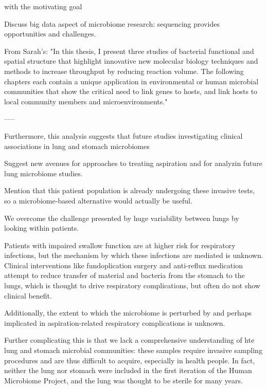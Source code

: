 with the motivating goal

Discuss big data aspect of microbiome research: sequencing provides opportunities and challenges.

From Sarah's: "In this thesis, I present three studies of bacterial functional and spatial structure that highlight innovative new molecular biology techniques and methods to increase throughput by reducing reaction volume. The following chapters each contain a unique application in environmental or human microbial communities that show the critical need to link genes to hosts, and link hosts to local community members and microenvironments."

-----

Furthermore, this analysis suggests that future studies investigating clinical associations in lung and stomach microbiomes

Suggest new avenues for approaches to treating aspiration and for analyzin future lung microbiome studies.

Mention that this patient population is already undergoing these invasive tests, so a microbiome-based alternative would actually be useful.

We overcome the challenge presented by huge variability between lungs by looking within patients.

Patients with impaired swallow function are at higher risk for respiratory infections, but the mechanism by which these infections are mediated is unknown.
Clinical interventions like fundoplication surgery and anti-reflux medication attempt to reduce transfer of material and bacteria from the stomach to the lungs, which is thought to drive respiratory complications, but often do not show clinical benefit.

Additionally, the extent to which the microbiome is perturbed by and perhaps implicated in aspiration-related respiratory complications is unknown.

Further complicating this is that we lack a comprehensive understanding of hte lung and stomach microbial communities: these samples require invasive sampling procedures and are thus difficult to acquire, especially in health people.
In fact, neither the lung nor stomach were included in the first iteration of the Human Microbiome Project, and the lung was thought to be sterile for many years.

